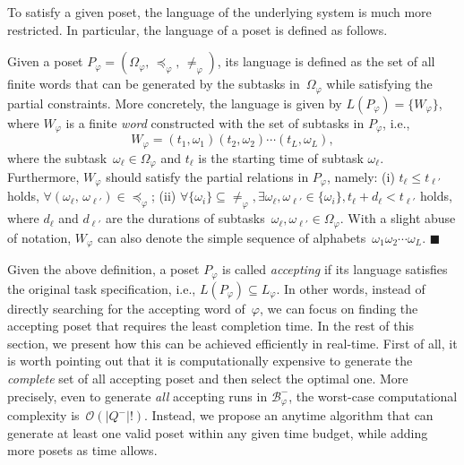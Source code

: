 To satisfy a given poset, the language of the underlying system is
much more restricted.
In particular, the language of a poset is defined as follows.

\begin{definition}\label{def:language-poset}
Given a poset $P_\varphi=(\Omega_{\varphi}, \, \preceq_{\varphi}, \, \neq_{\varphi})$,
its language is defined as the set of all finite words
that can be generated by the subtasks in~$\Omega_{\varphi}$
while satisfying the partial constraints.
More concretely, the language is given by
$L(P_\varphi)=\{W_{\varphi}\}$, where $W_{\varphi}$ is a finite
\emph{word} constructed with the set of subtasks in $P_\varphi$, i.e.,
\begin{equation}\label{eq:poset-language}
W_{\varphi}=(t_1,\omega_1) (t_2,\omega_2)\cdots (t_L,\omega_L),
\end{equation}
where the subtask~$\omega_\ell \in \Omega_\varphi$ and
$t_\ell$ is the starting time of subtask $\omega_\ell$.
Furthermore, $W_{\varphi}$ should satisfy the partial relations in $P_\varphi$, namely:
(i) $t_\ell \leq t_{\ell'}$ holds,
$\forall (\omega_\ell,\,\omega_{\ell'})\in \preceq_{\varphi}$;
(ii) $\forall \{\omega_{i}\}\subseteq \neq_{\varphi},
\exists\omega_{\ell},\omega_{\ell'}\in\{\omega_{i}\}, t_\ell + d_\ell <  t_{\ell'}$ holds,
where $d_\ell$ and $d_{\ell'}$ are the durations of
subtasks~$\omega_\ell, \omega_{\ell'} \in \Omega_{\varphi}$.
With a slight abuse of notation, $W_\varphi$ can also denote the
simple sequence of alphabets~$\omega_1\omega_2\cdots \omega_L$.
\hfill $\blacksquare$
\end{definition}

Given the above definition, a poset $P_\varphi$ is called \emph{accepting}
if its language satisfies the original task specification, i.e.,
$L(P_\varphi)\subseteq L_\varphi$.
In other words, instead of directly searching for the accepting word of~$\varphi$,
we can focus on finding the accepting poset that
requires the least completion time.
In the rest of this section, we present how this can be achieved efficiently
in real-time.
First of all, it is worth pointing out that it is computationally expensive to
generate the \emph{complete} set of all accepting poset
and then select the optimal one.
More precisely, even to generate \emph{all} accepting runs in $\mathcal{B}_{\varphi}^-$,
the worst-case computational complexity is~$\mathcal{O}(|Q^-|!)$.
Instead, we propose an anytime algorithm that can generate at least one
valid poset within any given time budget,
while adding more posets as time allows.


